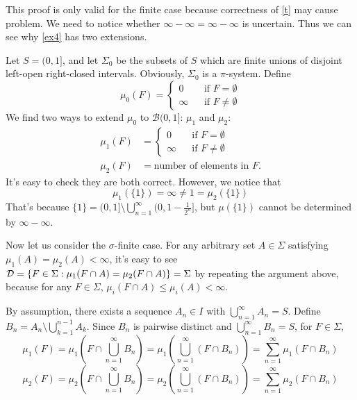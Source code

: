 This proof is only valid for the finite case because correctness of \cref{t} may cause problem. We need to notice whether $\infty - \infty = \infty - \infty$ is uncertain. Thus we can see why \cref{ex4} has two extensions.
\begin{example}
    \label{ex4}
    Let $S = (0, 1]$, and let $\Sigma_0$ be the subsets of $S$ which are finite unions of
    disjoint left-open right-closed intervals. Obviously, $\Sigma_0$ is a $\pi$-system. Define 
    \[
        \mu_0(F) = \left\{ 
            \begin{array}{lcl}
                0 & & \text{if } F = \emptyset \\
                \infty & & \text{if } F \neq \emptyset
            \end{array}
        \right.
    \]
    We find two ways to extend $\mu_0$ to $\mathcal{B} (0, 1]$: $\mu_1$ and $\mu_2$:
    \begin{align*}
        \mu_1(F) &= \left\{ 
            \begin{array}{lcl}
                0 & & \text{if } F = \emptyset \\
                \infty & & \text{if } F \neq \emptyset
            \end{array}
        \right. \\
        \mu_2(F) &= \text{number of elements in } F.
    \end{align*}
   It's easy to check they are both correct. However, we notice that 
   \[\mu_1(\{1\}) = \infty \neq 1 = \mu_2(\{1\})\]
   That's because 
   $\{1\} = (0, 1] \setminus \bigcup_{n = 1}^{\infty }(0, 1 - \frac{1}{2^n}]$, but $\mu(\{1\})$ cannot be determined by $\infty - \infty$.
\end{example}

Now let us consider the $\sigma$-finite case. For any arbitrary set $A \in \Sigma$ satisfying $\mu_1(A) = \mu_2(A) < \infty$, it's easy to see $ \mathcal{D} = \{F \in \Sigma : \mu_1(F \cap A) = \mu_2(F \cap A)\} = \Sigma$ by repeating the argument above, because for any $F \in \Sigma$, $\mu_i(F \cap A) \leq \mu_i(A) < \infty$. 

By assumption, there exists a sequence $A_n \in I$ with $ \bigcup_{n = 1}^{\infty} A_n = S$. Define $B_n = A_n \setminus \bigcup_{k = 1}^{n - 1} A_k$. Since $B_n$ is pairwise distinct and $\bigcup_{n = 1}^{\infty} B_n = S$, for $F \in \Sigma$, 
\[\mu_1(F) = \mu_1(F \cap \bigcup_{n = 1}^{\infty} B_n ) = \mu_1(\bigcup_{n = 1}^{\infty} (F \cap B_n)) = \sum_{n=1}^\infty \mu_1(F \cap B_n)\]
\[\mu_2(F) = \mu_2(F \cap \bigcup_{n = 1}^{\infty} B_n ) = \mu_2(\bigcup_{n = 1}^{\infty} (F \cap B_n)) = \sum_{n=1}^\infty \mu_2(F \cap B_n)\]

